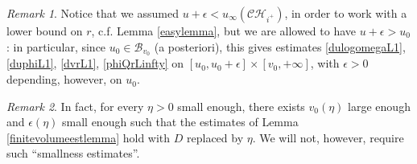 \documentclass[10pt,a4paper]{article}
\theoremstyle{plain}
\theoremstyle{remark}
\newtheorem{rmk}{Remark}[section]
\theoremstyle{definition}
\theoremstyle{plain}
\theoremstyle{remark}
\theoremstyle{definition}
\newcommand{\CH}{\mathcal{CH}_{i^+}}
\numberwithin{equation}{section}
\begin{document}
\begin{rmk} \label{estimates>u0} Notice that we assumed $u+\epsilon < u_{\infty}(\CH)$, in order to work with a lower bound on $r$, c.f. Lemma \ref{easylemma}, but we are allowed to have $u+\epsilon > u_0$: in particular, since $u_0 \in \mathcal{B}_{v_0}$ (a posteriori), this gives estimates \eqref{dulogomegaL1}, \eqref{duphiL1}, \eqref{dvrL1}, \eqref{phiQrLinfty} on $[u_0,u_0+\epsilon] \times [v_0,+\infty]$, with $\epsilon>0$ depending, however, on $u_0$.
\end{rmk} \begin{rmk}
In fact, for every $\eta>0$ small enough, there exists $v_0(\eta)$ large enough and $\epsilon(\eta)$ small enough such that the estimates of Lemma \ref{finitevolumeestlemma} hold with $D$ replaced by $\eta$. We will not, however, require such ``smallness estimates''.
\end{rmk}
\end{document}
